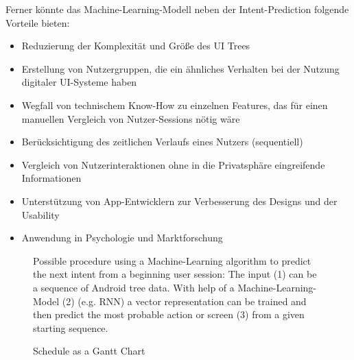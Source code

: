 Ferner könnte das Machine-Learning-Modell neben der Intent-Prediction folgende Vorteile bieten:
\begin{itemize}
  \item Reduzierung der Komplexität und Größe des UI Trees
  \item Erstellung von Nutzergruppen, die ein ähnliches Verhalten bei der Nutzung digitaler UI-Systeme haben
  \item Wegfall von technischem Know-How zu einzelnen Features, das für einen manuellen Vergleich von Nutzer-Sessions nötig wäre \cite{ghods2019activity2vec}
  \item Berücksichtigung des zeitlichen Verlaufs eines Nutzers (sequentiell)
  \item Vergleich von Nutzerinteraktionen ohne in die Privatsphäre eingreifende Informationen
  \item Unterstützung von App-Entwicklern zur Verbesserung des Designs und der Usability
  \item Anwendung in Psychologie und Marktforschung
\end{itemize}

\begin{figure}
  \centering
  
  \caption{Possible procedure using a Machine-Learning algorithm to predict the next intent from a beginning user session: The input (1) can be a sequence of Android tree data. With help of a Machine-Learning-Model (2) (e.g. RNN) a vector representation can be trained and then predict the most probable action or screen (3) from a given starting sequence.}
  \label{fig:encode-decode}
\end{figure}

\begin{figure}
  \centering
  
  \caption{Schedule as a Gantt Chart}
  \label{fig:schedule}
\end{figure}
